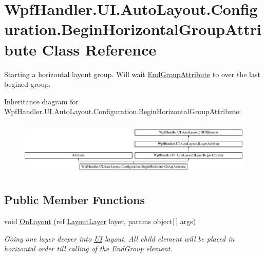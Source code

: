 \hypertarget{class_wpf_handler_1_1_u_i_1_1_auto_layout_1_1_configuration_1_1_begin_horizontal_group_attribute}{}\section{Wpf\+Handler.\+U\+I.\+Auto\+Layout.\+Configuration.\+Begin\+Horizontal\+Group\+Attribute Class Reference}
\label{class_wpf_handler_1_1_u_i_1_1_auto_layout_1_1_configuration_1_1_begin_horizontal_group_attribute}


Starting a horizontal layout group. Will wait \mbox{\hyperlink{class_wpf_handler_1_1_u_i_1_1_auto_layout_1_1_configuration_1_1_end_group_attribute}{End\+Group\+Attribute}} to over the last begined group.  


Inheritance diagram for Wpf\+Handler.\+U\+I.\+Auto\+Layout.\+Configuration.\+Begin\+Horizontal\+Group\+Attribute\+:\begin{figure}[H]
\begin{center}
\leavevmode
\includegraphics[height=2.635294cm]{db/d6f/class_wpf_handler_1_1_u_i_1_1_auto_layout_1_1_configuration_1_1_begin_horizontal_group_attribute}
\end{center}
\end{figure}
\subsection*{Public Member Functions}
\begin{DoxyCompactItemize}
\item 
void \mbox{\hyperlink{class_wpf_handler_1_1_u_i_1_1_auto_layout_1_1_configuration_1_1_begin_horizontal_group_attribute_a8bb61f969389bece86c87fbfa44d4c82}{On\+Layout}} (ref \mbox{\hyperlink{class_wpf_handler_1_1_u_i_1_1_auto_layout_1_1_layout_layer}{Layout\+Layer}} layer, params object\mbox{[}$\,$\mbox{]} args)
\begin{DoxyCompactList}\small\item\em Going one layer deeper into \mbox{\hyperlink{namespace_wpf_handler_1_1_u_i}{UI}} layout. All child element will be placed in horizontal order till calling of the End\+Group element. \end{DoxyCompactList}\end{DoxyCompactItemize}
